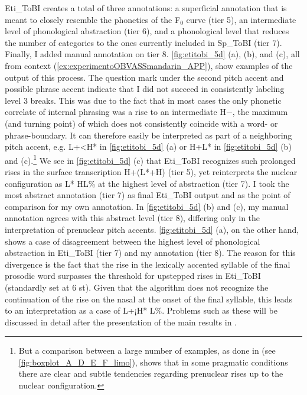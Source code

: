 Eti\_ToBI creates a total of three annotations: a superficial annotation that is meant to closely resemble the phonetics of the F$_0$ curve (tier 5), an intermediate level of phonological abstraction (tier 6), and a phonological level that reduces the number of categories to the ones currently included in Sp\_ToBI (tier 7). Finally, I added manual annotation on tier 8. \autoref{fig:etitobi_5d} (a), (b), and (c), all from context (\ref{ex:experimentoOBVASSmandarin_APP}), show examples of the output of this process. The question mark under the second pitch accent and possible phrase accent indicate that I did not succeed in consistently labeling level 3 breaks. This was due to the fact that in most cases the only phonetic correlate of internal phrasing was a rise to an intermediate H$-$, the maximum (and turning point) of which does not consistently coincide with a word- or phrase-boundary. It can therefore easily be interpreted as part of a neighboring pitch accent, e.g. L+<H* in \autoref{fig:etitobi_5d} (a) or H+L* in \autoref{fig:etitobi_5d} (b) and (c).\footnote{But a comparison between a large number of examples, as done in  (see \autoref{fig:boxplot_A_D_E_F_limo}), shows that in some pragmatic conditions there are clear and subtle tendencies regarding prenuclear rises up to the nuclear configuration.} We see in \autoref{fig:etitobi_5d} (c) that Eti\_ToBI recognizes such prolonged rises in the surface transcription H+(L*+H) (tier 5), yet reinterprets the nuclear configuration as L* HL\% at the highest level of abstraction (tier 7). I took the most abstract annotation (tier 7) as final Eti\_ToBI output and as the point of comparison for my own annotation. In \autoref{fig:etitobi_5d} (b) and (c), my manual annotation agrees with this abstract level (tier 8), differing only in the interpretation of prenuclear pitch accents. \autoref{fig:etitobi_5d} (a), on the other hand, shows a case of disagreement between the highest level of phonological abstraction in Eti\_ToBI (tier 7) and my annotation (tier 8). The reason for this divergence is the fact that the rise in the lexically accented syllable of the final prosodic word surpasses the threshold for upstepped rises in Eti\_ToBI (standardly set at 6 st). Given that the algorithm does not recognize the continuation of the rise on the nasal at the onset of the final syllable, this leads to an interpretation as a case of L+¡H* L\%. Problems such as these will be discussed in detail after the presentation of the main results in .

